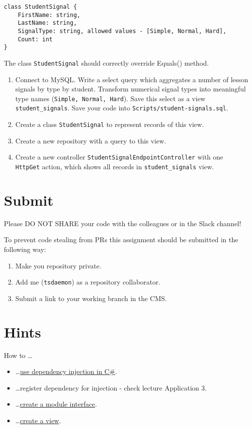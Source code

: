 \documentclass[12pt]{article}
\newcommand{\code}[1]{\texttt{#1}}
\begin{document}
\begin{verbatim}
class StudentSignal {
    FirstName: string,
    LastName: string,
    SignalType: string, allowed values - [Simple, Normal, Hard],
    Count: int
}
\end{verbatim}

The class \code{StudentSignal} should correctly override Equals() method.

\begin{enumerate}
\item Connect to MySQL. Write a select query which aggregates a number of lesson signals by type by student. Transform numerical signal types into meaningful type names (\code{Simple, Normal, Hard}). Save this select as a view \code{student\_signals}. Save your code into \code{Scripts/student-signals.sql}.
\item Create a class \code{StudentSignal} to represent records of this view.
\item Create a new repository with a query to this view.
\item Create a new controller \code{StudentSignalEndpointController} with one \code{HttpGet} action, which shows all records in \code{student\_signals} view.
\end{enumerate}

\section*{Submit}

Please DO NOT SHARE your code with the colleagues or in the Slack channel!

To prevent code stealing from PRs this assignment should be submitted in the following way:
\begin{enumerate}
\item Make you repository private.
\item Add me (\code{tsdaemon}) as a repository collaborator.
\item Submit a link to your working branch in the CMS.
\end{enumerate}

\clearpage

\section*{Hints}
How to \dots
\begin{itemize}
\item \dots \href{https://docs.microsoft.com/en-us/aspnet/core/fundamentals/dependency-injection?view=aspnetcore-2.1}{use dependency injection in C\#}.
\item \dots register dependency for injection - check lecture Application 3.
\item \dots \href{https://www.codeproject.com/Articles/10197/The-Interface-Construct-in-C}{create a module interface}.
\item \dots \href{https://dev.mysql.com/doc/refman/8.0/en/create-view.html}{create a view}.

\end{itemize}
\end{document}

